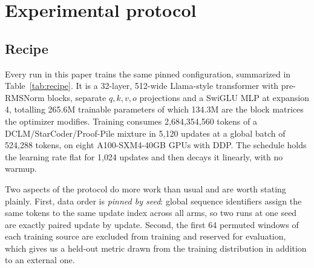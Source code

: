 \section{Experimental protocol}
\label{sec:protocol}

\subsection{Recipe}

Every run in this paper trains the same pinned configuration, summarized in
Table~\ref{tab:recipe}. It is a 32-layer, 512-wide Llama-style transformer with
pre-RMSNorm blocks, separate $q,k,v,o$ projections and a SwiGLU MLP at
expansion 4, totalling 265.6M trainable parameters of which 134.3M are the
block matrices the optimizer modifies. Training consumes 2{,}684{,}354{,}560
tokens of a DCLM/StarCoder/Proof-Pile mixture in 5{,}120 updates at a global
batch of 524{,}288 tokens, on eight A100-SXM4-40GB GPUs with DDP. The schedule
holds the learning rate flat for 1{,}024 updates and then decays it linearly,
with no warmup.

Two aspects of the protocol do more work than usual and are worth stating
plainly. First, data order is \emph{pinned by seed}: global sequence
identifiers assign the same tokens to the same update index across all arms, so
two runs at one seed are exactly paired update by update. Second, the first 64
permuted windows of each training source are excluded from training and
reserved for evaluation, which gives us a held-out metric drawn from the
training distribution in addition to an external one.

